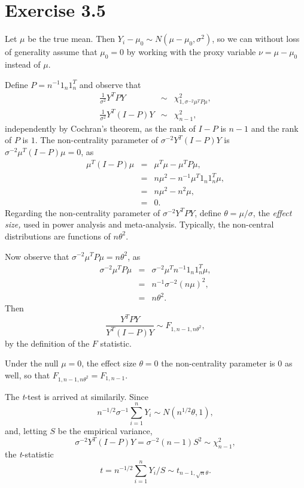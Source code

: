 \section*{Exercise 3.5}

Let $\mu$ be the true mean. Then $Y_{i}-\mu_{0}\sim N(\mu-\mu_{0},\sigma^{2})$,
so we can without loss of generality assume that $\mu_{0}=0$ by working
with the proxy variable $\nu=\mu-\mu_{0}$ instead of $\mu$.

Define $P=n^{-1}1_{n}1_{n}^{T}$ and observe that
\begin{eqnarray*}
\frac{1}{\sigma^{2}}Y^{T}PY & \sim & \chi_{1,\sigma^{-2}\mu^{T}P\mu}^{2},\\
\frac{1}{\sigma^{2}}Y^{T}(I-P)Y & \sim & \chi_{n-1}^{2},
\end{eqnarray*}
independently by Cochran's theorem, as the rank of $I-P$ is $n-1$
and the rank of $P$ is $1$. The non-centrality parameter of $\sigma^{-2}Y^{T}(I-P)Y$
is $\sigma^{-2}\mu^{T}(I-P)\mu=0$, as
\begin{eqnarray*}
\mu^{T}(I-P)\mu & = & \mu^{T}\mu-\mu^{T}P\mu,\\
 & = & n\mu^{2}-n^{-1}\mu^{T}1_{n}1_{n}^{T}\mu,\\
 & = & n\mu^{2}-n^{2}\mu,\\
 & = & 0.
\end{eqnarray*}
Regarding the non-centrality parameter of $\sigma^{-2}Y^{T}PY$, define
$\theta=\mu/\sigma$, the \emph{effect size, }used in power analysis
and meta-analysis. Typically, the non-central distributions are functions
of $n\theta^{2}$.

Now observe that $\sigma^{-2}\mu^{T}P\mu=n\theta^{2}$, as 
\begin{eqnarray*}
\sigma^{-2}\mu^{T}P\mu & = & \sigma^{-2}\mu^{T}n^{-1}1_{n}1_{n}^{T}\mu,\\
 & = & n^{-1}\sigma^{-2}(n\mu)^{2},\\
 & = & n\theta^{2}.
\end{eqnarray*}
Then 
\[
\frac{Y^{T}PY}{Y^{T}(I-P)Y}\sim F_{1,n-1,n\theta^{2}},
\]
by the definition of the $F$ statistic. 

Under the null $\mu=0$, the effect size $\theta=0$ the non-centrality
parameter is $0$ as well, so that $F_{1,n-1,n\theta^{2}}=F_{1,n-1}$. 

The \emph{t}-test is arrived at similarily. Since
\[
n^{-1/2}\sigma^{-1}\sum_{i=1}^{n}Y_{i}\sim N(n^{1/2}\theta,1),
\]
and, letting $S$ be the empirical variance,
\[
\sigma^{-2}Y^{T}(I-P)Y=\sigma^{-2}(n-1)S^{2}\sim\chi_{n-1}^{2},
\]
the \emph{t}-statistic
\[
t=n^{-1/2}\sum_{i=1}^{n}Y_{i}/S\sim t_{n-1,\sqrt{n}\theta}.
\]


